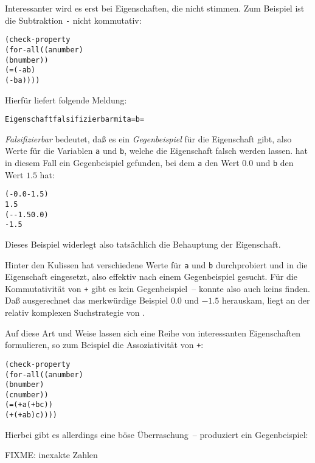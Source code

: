 Interessanter wird es erst bei Eigenschaften, die nicht stimmen.  Zum
Beispiel ist die Subtraktion \texttt{-} nicht kommutativ:
%
\begin{alltt}
(check-property
 (for-all ((a number)
           (b number))
   (= (- a b)
      (- b a))))
\end{alltt}
%
Hierfür liefert \drscheme{} folgende Meldung:
%
\begin{alltt}
        Eigenschaft falsifizierbar mit a =  b = 
\end{alltt}
%
\textit{Falsifizierbar} bedeutet, daß es ein
\textit{Gegenbeispiel} für die Eigenschaft gibt,
also Werte für die Variablen \texttt{a} und \texttt{b}, welche die
Eigenschaft falsch werden lassen.  \drscheme{} hat in diesem Fall ein
Gegenbeispiel gefunden, bei dem \texttt{a} den Wert $0.0$ und
\texttt{b} den Wert $1.5$ hat:
%
\begin{alltt}
(- 0.0 -1.5)
\evalsto{} 1.5
(- -1.5 0.0)
\evalsto{} -1.5
\end{alltt}
%
Dieses Beispiel widerlegt also tatsächlich die Behauptung der Eigenschaft.

Hinter den Kulissen hat \drscheme{} verschiedene Werte für \texttt{a} und
\texttt{b} durchprobiert und in die Eigenschaft eingesetzt, also effektiv
nach einem Gegenbeispiel gesucht.  Für die Kommutativität von
\texttt{+} gibt es kein Gegenbeispiel~-- \drscheme{} konnte also auch
keins finden.  Daß ausgerechnet das merkwürdige Beispiel $0.0$ und
$-1.5$ herauskam, liegt an der relativ komplexen Suchstrategie von
\drscheme{}.

Auf diese Art und Weise lassen sich eine Reihe von interessanten
Eigenschaften formulieren, so zum Beispiel die Assoziativität von
\texttt{+}:\label{sec:plus-not-associative}
%
\begin{alltt}
(check-property
 (for-all ((a number)
           (b number)
           (c number))
    (= (+ a (+ b c))
       (+ (+ a b) c))))
\end{alltt}
%
Hierbei gibt es allerdings eine böse Überraschung~-- \drscheme{} produziert
ein Gegenbeispiel:

FIXME: inexakte Zahlen

